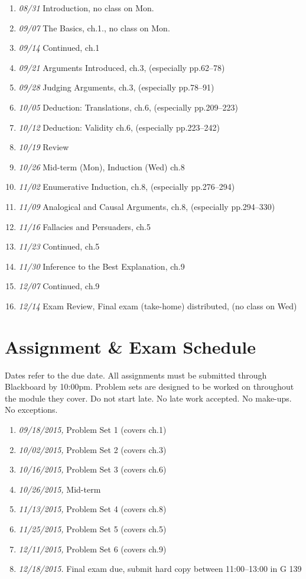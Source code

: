 \documentclass[article,oneside]{memoir}
\begin{document}
\begin{enumerate}
\item \textit{08/31} Introduction,  no class on Mon.
\item \textit{09/07} The Basics,  ch.1., no class on Mon.
\item \textit{09/14} Continued, ch.1 
\item \textit{09/21} Arguments Introduced, ch.3, (especially pp.62--78)
\item \textit{09/28} Judging Arguments, ch.3, (especially pp.78--91)
\item \textit{10/05} Deduction: Translations, ch.6, (especially pp.209--223)
\item \textit{10/12} Deduction: Validity ch.6, (especially pp.223--242)
\item \textit{10/19} Review
\item \textit{10/26} Mid-term (Mon), Induction (Wed) ch.8
\item \textit{11/02} Enumerative Induction, ch.8, (especially pp.276--294)
\item \textit{11/09} Analogical and Causal Arguments, ch.8, (especially pp.294--330)
\item \textit{11/16} Fallacies and Persuaders, ch.5
 \item \textit{11/23} Continued, ch.5
 \item \textit{11/30} Inference to the Best Explanation, ch.9
\item \textit{12/07} Continued,  ch.9
\item \textit{12/14} Exam Review, Final exam (take-home) distributed, (no class on Wed)
\end{enumerate}


\section{Assignment \& Exam Schedule}
Dates refer to the due date. All assignments must be submitted through Blackboard by 10:00pm. Problem sets are designed to be worked on throughout the module they cover. Do not start late. No late work accepted. No make-ups. No exceptions. 

\begin{enumerate}
\item \textit{09/18/2015,} Problem Set 1 (covers ch.1)
\item \textit{10/02/2015,} Problem Set 2 (covers ch.3)
\item \textit{10/16/2015,} Problem Set 3 (covers ch.6)
\item \textit{10/26/2015,} Mid-term 
\item \textit{11/13/2015,} Problem Set 4 (covers ch.8)
\item \textit{11/25/2015,} Problem Set 5 (covers ch.5)
\item \textit{12/11/2015,} Problem Set 6 (covers ch.9)
\item \textit{12/18/2015.} Final exam due, submit hard copy between 11:00--13:00 in G 139 
\end{enumerate}


\end{document}
